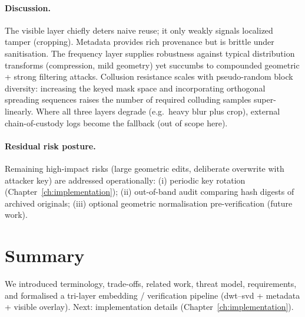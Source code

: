 \paragraph{Discussion.} The visible layer chiefly deters naive reuse; it only weakly signals localized tamper (cropping).
Metadata provides rich provenance but is brittle under sanitisation.
The frequency layer supplies robustness against typical distribution transforms (compression, mild geometry) yet succumbs to compounded geometric + strong filtering attacks.
Collusion resistance scales with pseudo-random block diversity: increasing the keyed mask space and incorporating orthogonal spreading sequences raises the number of required colluding samples super-linearly.
Where all three layers degrade (e.g.\ heavy blur plus crop), external chain-of-custody logs become the fallback (out of scope here).

\paragraph{Residual risk posture.} Remaining high-impact risks (large geometric edits, deliberate overwrite with attacker key) are addressed operationally: (i) periodic key rotation (Chapter~\ref{ch:implementation}); (ii) out-of-band audit comparing hash digests of archived originals; (iii) optional geometric normalisation pre-verification (future work).

\section{Summary}
\label{sec:deep_dive:summary}
We introduced terminology, trade-offs, related work, threat model, requirements, and formalised a tri-layer embedding / verification pipeline (\gls{dwt}–\gls{svd} + metadata + visible overlay).
Next: implementation details (Chapter~\ref{ch:implementation}).
